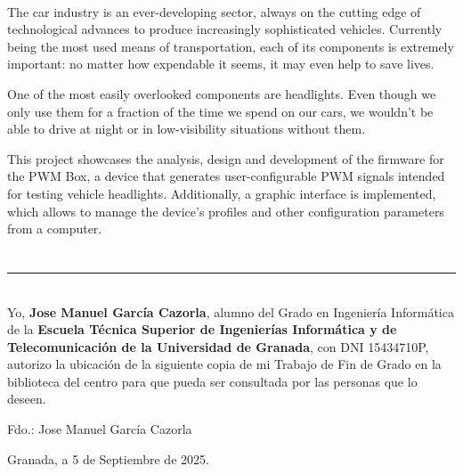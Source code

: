\vspace{0.7cm}
\\

The car industry is an ever-developing sector, always on the cutting edge of technological advances to produce increasingly sophisticated vehicles. Currently being the most used means of transportation, each of its components is extremely important: no matter how expendable it seems, it may even help to save lives.

One of the most easily overlooked components are headlights. Even though we only use them for a fraction of the time we spend on our cars, we wouldn't be able to drive at night or in low-visibility situations without them.

This project showcases the analysis, design and development of the firmware for the PWM Box, a device that generates user-configurable PWM signals intended for testing vehicle headlights. Additionally, a graphic interface is implemented, which allows to manage the device's profiles and other configuration parameters from a computer.

\chapter*{}
\thispagestyle{empty}

\noindent\rule[-1ex]{\textwidth}{2px}\\[4.5ex]

Yo, \textbf{Jose Manuel García Cazorla}, alumno del Grado en Ingeniería Informática de la \textbf{Escuela Técnica Superior de Ingenierías Informática y de Telecomunicación de la Universidad de Granada}, con DNI 15434710P, autorizo la ubicación de la siguiente copia de mi Trabajo de Fin de Grado en la biblioteca del centro para que pueda ser consultada por las personas que lo deseen.

\vspace{6cm}

\noindent Fdo.: Jose Manuel García Cazorla

\vspace{2cm}

\begin{flushright}
    Granada, a 5 de Septiembre de 2025.
\end{flushright}

\chapter*{}
\thispagestyle{empty}


